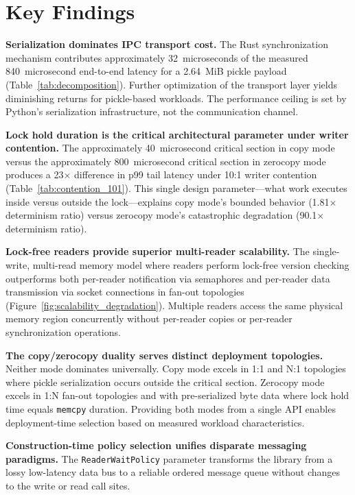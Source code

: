 \section{Key Findings}

\textbf{Serialization dominates IPC transport cost.} The Rust synchronization mechanism contributes approximately 32~microseconds of the measured 840~microsecond end-to-end latency for a 2.64~MiB pickle payload (Table~\ref{tab:decomposition}). Further optimization of the transport layer yields diminishing returns for pickle-based workloads. The performance ceiling is set by Python's serialization infrastructure, not the communication channel.

\textbf{Lock hold duration is the critical architectural parameter under writer contention.} The approximately 40~microsecond critical section in copy mode versus the approximately 800~microsecond critical section in zerocopy mode produces a 23$\times$ difference in p99 tail latency under 10:1 writer contention (Table~\ref{tab:contention_101}). This single design parameter---what work executes inside versus outside the lock---explains copy mode's bounded behavior (1.81$\times$ determinism ratio) versus zerocopy mode's catastrophic degradation (90.1$\times$ determinism ratio).

\textbf{Lock-free readers provide superior multi-reader scalability.} The single-write, multi-read memory model where readers perform lock-free version checking outperforms both per-reader notification via semaphores and per-reader data transmission via socket connections in fan-out topologies (Figure~\ref{fig:scalability_degradation}). Multiple readers access the same physical memory region concurrently without per-reader copies or per-reader synchronization operations.

\textbf{The copy/zerocopy duality serves distinct deployment topologies.} Neither mode dominates universally. Copy mode excels in 1:1 and N:1 topologies where pickle serialization occurs outside the critical section. Zerocopy mode excels in 1:N fan-out topologies and with pre-serialized byte data where lock hold time equals \texttt{memcpy} duration. Providing both modes from a single API enables deployment-time selection based on measured workload characteristics.

\textbf{Construction-time policy selection unifies disparate messaging paradigms.} The \texttt{ReaderWaitPolicy} parameter transforms the library from a lossy low-latency data bus to a reliable ordered message queue without changes to the write or read call sites.

